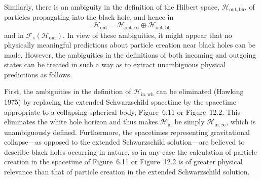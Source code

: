 Similarly, there is an ambiguity in the definition of the Hilbert space,
\(\mathcal H_{\mathrm{out},\mathrm{bh}}\), of particles propagating into the black
hole, and hence in
\[
  \mathcal H_{\mathrm{out}}
  =\mathcal H_{\mathrm{out},\infty}\oplus\mathcal H_{\mathrm{out},\mathrm{bh}}
\]
and in \(\mathcal F_s(\mathcal H_{\mathrm{out}})\). In view of these ambiguities, it
might appear that no physically meaningful predictions about particle creation near
black holes can be made. However, the ambiguities in the definitions of both
incoming and outgoing states can be treated in such a way as to extract unambiguous
physical predictions as follows.

First, the ambiguities in the definition of \(\mathcal H_{\mathrm{in},\mathrm{wh}}\)
can be eliminated (Hawking 1975) by replacing the extended Schwarzschild spacetime
by the spacetime appropriate to a collapsing spherical body, Figure~6.11 or
Figure~12.2. This eliminates the white hole horizon and thus makes
\(\mathcal H_{\mathrm{in}}\) be simply \(\mathcal H_{\mathrm{in},\infty}\), which
is unambiguously defined. Furthermore, the spacetimes representing gravitational
collapse---as opposed to the extended Schwarzschild solution---are believed to
describe black holes occurring in nature, so in any case the calculation of particle
creation in the spacetime of Figure~6.11 or Figure~12.2 is of greater physical
relevance than that of particle creation in the extended Schwarzschild solution.


